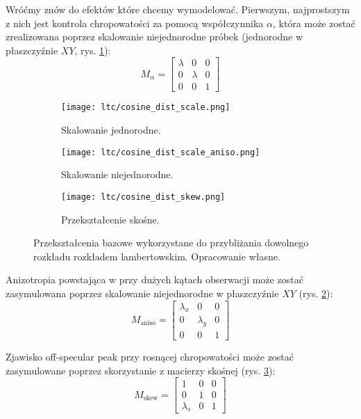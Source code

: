 \documentclass[../main.tex]{subfiles}
\begin{document}
Wróćmy znów do efektów które chcemy wymodelować. Pierwszym, najprostszym z nich jest kontrola chropowatości za pomocą współczynnika $\alpha$, która może zostać zrealizowana poprzez skalowanie niejednorodne próbek (jednorodne w płaszczyźnie $XY$, rys. \ref{fig:LTCEqualScale}):
\[
M_{\alpha} =
\begin{bmatrix}
  \lambda & 0 & 0 \\
  0 & \lambda & 0 \\
  0 & 0 & 1
\end{bmatrix}
\]

\begin{figure}[h]
\centering
    \begin{subfigure}[t]{0.25\textwidth}
        \texttt{[image: ltc/cosine\_dist\_scale.png]}
        \caption{Skalowanie jednorodne.}
        \label{fig:LTCEqualScale}
    \end{subfigure}
    \hspace{0.03\textwidth}
    \begin{subfigure}[t]{0.25\textwidth}
        \centering
        \texttt{[image: ltc/cosine\_dist\_scale\_aniso.png]}
        \caption{Skalowanie niejednorodne.}
        \label{fig:LTCAnisoScale}
    \end{subfigure}
    \hspace{0.03\textwidth}
    \begin{subfigure}[t]{0.25\textwidth}
        \centering
        \texttt{[image: ltc/cosine\_dist\_skew.png]}
        \caption{Przekształcenie skośne.}
        \label{fig:LTCSkew}
    \end{subfigure}
    \caption{Przekształcenia bazowe wykorzystane do przybliżania dowolnego rozkładu rozkładem lambertowskim. Opracowanie własne.}
    \label{fig:LTCTransforms}
\end{figure}

Anizotropia powstająca w przy dużych kątach obserwacji może zostać zasymulowana poprzez skalowanie niejednorodne w płaszczyźnie $XY$ (rys. \ref{fig:LTCAnisoScale}):
\[
M_{\text{aniso}} =
\begin{bmatrix}
  \lambda_x & 0 & 0 \\
  0 & \lambda_y & 0 \\
  0 & 0 & 1
\end{bmatrix}
\]



Zjawisko off-specular peak przy rosnącej chropowatości może zostać zasymulowane poprzez skorzystanie z macierzy skośnej (rys. \ref{fig:LTCSkew}):
\[
M_{\text{skew}} =
\begin{bmatrix}
  1 & 0 & 0 \\
  0 & 1 & 0 \\
  \lambda_{s} & 0 & 1
\end{bmatrix}
\]
\end{document}
